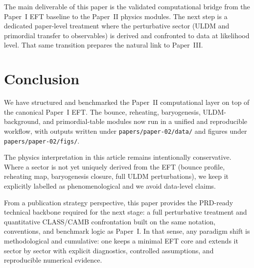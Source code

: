 \documentclass[aps,prd,onecolumn,nofootinbib,superscriptaddress]{revtex4-2}
\begin{document}
The main deliverable of this paper is the validated computational bridge from the Paper~I EFT baseline to the Paper~II physics modules.
The next step is a dedicated paper-level treatment where the perturbative sector (ULDM and primordial transfer to observables) is derived and confronted to data at likelihood level.
That same transition prepares the natural link to Paper~III.

\section{Conclusion}

We have structured and benchmarked the Paper~II computational layer on top of the canonical Paper~I EFT.
The bounce, reheating, baryogenesis, ULDM-background, and primordial-table modules now run in a unified and reproducible workflow, with outputs written under
\texttt{papers/paper-02/data/} and figures under \texttt{papers/paper-02/figs/}.

The physics interpretation in this article remains intentionally conservative.
Where a sector is not yet uniquely derived from the EFT (bounce profile, reheating map, baryogenesis closure, full ULDM perturbations), we keep it explicitly labelled as phenomenological and we avoid data-level claims.

From a publication strategy perspective, this paper provides the PRD-ready technical backbone required for the next stage: a full perturbative treatment and quantitative CLASS/CAMB confrontation built on the same notation, conventions, and benchmark logic as Paper~I.
In that sense, any paradigm shift is methodological and cumulative: one keeps a minimal EFT core and extends it sector by sector with explicit diagnostics, controlled assumptions, and reproducible numerical evidence.
\end{document}
